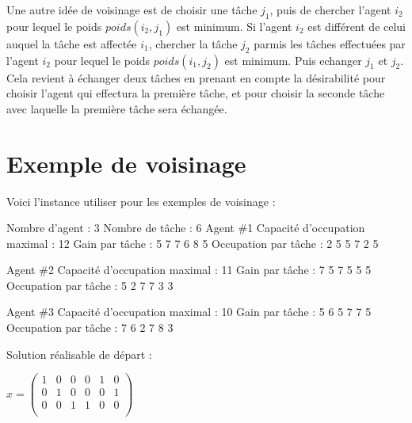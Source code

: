 \documentclass{article}
\begin{document}
Une autre idée de voisinage est de choisir une tâche $j_{1}$, puis de chercher l'agent $i_{2}$ pour lequel le poids $poids(i_{2},j_{1})$ est minimum. Si l'agent $i_{2}$ est différent de celui auquel la tâche est affectée $i_{1}$, chercher la tâche $j_{2}$ parmis les tâches effectuées par l'agent $i_{2}$ pour lequel le poids $poids(i_{1},j_{2})$ est minimum. Puis echanger $j_{1}$ et $j_{2}$.
Cela revient à échanger deux tâches en prenant en compte la désirabilité pour choisir l'agent qui effectura la première tâche, et pour choisir la seconde tâche avec laquelle la première tâche sera échangée.



\section{Exemple de voisinage}

Voici l'instance utiliser pour les exemples de voisinage :

Nombre d'agent : 3
Nombre de tâche : 6
Agent \#1
Capacité d'occupation maximal : 12
Gain par tâche : 		5	7	7	6	8	5
Occupation par tâche :	2	5	5	7	2	5

Agent \#2
Capacité d'occupation maximal : 11
Gain par tâche : 		7	5	7	5	5	5
Occupation par tâche :	5	2	7	7	3	3

Agent \#3
Capacité d'occupation maximal : 10
Gain par tâche : 		5	6	5	7	7	5
Occupation par tâche :	7	6	2	7	8	3

Solution réalisable de départ :

$x = \begin{pmatrix}
 1&0&0&0&1&0 \\
 0&1&0&0&0&1 \\
 0&0&1&1&0&0 \\
\end{pmatrix}$
\end{document}

